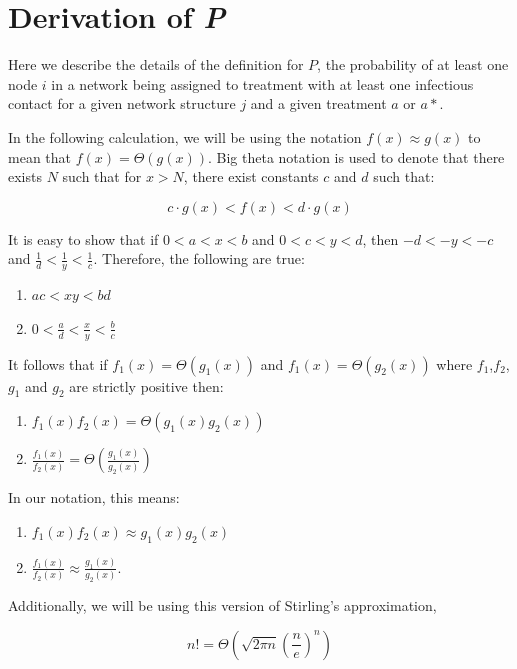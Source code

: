 \documentclass{article}
\theoremstyle{definition}
\begin{document}
\newpage



\newpage


\appendix
{}
\section{Derivation of  \textit{P}}
\label{Appendix 1}
Here we describe the details of the definition for $P$, the probability of at least one node $i$ in a network being assigned to treatment with at least one infectious contact for a given network structure $j$ and a given treatment $a$ or $a*$.

In the following calculation, we will be using the notation $f(x)\approx g(x)$ to mean that $f(x)=\Theta(g(x))$. Big theta notation is used to denote that there exists $N$ such that for $x>N$, there exist constants $c$ and $d$ such that:

 $$c\cdot g(x)< f(x) < d \cdot g(x) $$

It is easy to show that if $0<a<x<b$ and $0<c<y<d$, then $-d<-y<-c$ and $\frac{1}{d}<\frac{1}{y}<\frac{1}{c}$.  Therefore, the following are true:
\begin{enumerate}
\item $ac<xy<bd$
\item $0<\frac{a}{d}<\frac{x}{y}<\frac{b}{c}$
\end{enumerate}

It follows that if $f_1(x)=\Theta{\left(g_1(x)\right)}$ and $f_1(x)=\Theta{\left(g_2(x)\right)}$ where $f_1$,$f_2$, $g_1$ and $g_2$ are strictly positive then:
\begin{enumerate}
\item $f_1(x)f_2(x)=\Theta{\left(g_1(x)g_2(x)\right)}$
\item $\frac{f_1(x)}{f_2(x)}=\Theta{\left(\frac{g_1(x)}{g_2(x)}\right)}$
\end{enumerate}

In our notation, this means:
\begin{enumerate}
     \item $f_1(x)f_2(x)\approx g_1(x)g_2(x)$ 
     \item $\frac{f_1(x)}{f_2(x)}\approx \frac{g_1(x)}{g_2(x)}$.
\end{enumerate}


Additionally, we will be using this version of Stirling's approximation,

$$n!= \Theta\left(\sqrt{2\pi n}\left(\frac{n}{e}\right)^n \right)$$
\end{document}

